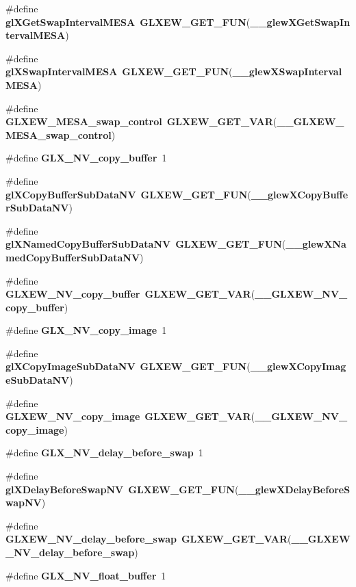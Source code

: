 \begin{DoxyCompactItemize}
\item 
\#define {\bf gl\+X\+Get\+Swap\+Interval\+M\+E\+SA}~{\bf G\+L\+X\+E\+W\+\_\+\+G\+E\+T\+\_\+\+F\+UN}({\bf \+\_\+\+\_\+glew\+X\+Get\+Swap\+Interval\+M\+E\+SA})
\item 
\#define {\bf gl\+X\+Swap\+Interval\+M\+E\+SA}~{\bf G\+L\+X\+E\+W\+\_\+\+G\+E\+T\+\_\+\+F\+UN}({\bf \+\_\+\+\_\+glew\+X\+Swap\+Interval\+M\+E\+SA})
\item 
\#define {\bf G\+L\+X\+E\+W\+\_\+\+M\+E\+S\+A\+\_\+swap\+\_\+control}~{\bf G\+L\+X\+E\+W\+\_\+\+G\+E\+T\+\_\+\+V\+AR}({\bf \+\_\+\+\_\+\+G\+L\+X\+E\+W\+\_\+\+M\+E\+S\+A\+\_\+swap\+\_\+control})
\item 
\#define {\bf G\+L\+X\+\_\+\+N\+V\+\_\+copy\+\_\+buffer}~1
\item 
\#define {\bf gl\+X\+Copy\+Buffer\+Sub\+Data\+NV}~{\bf G\+L\+X\+E\+W\+\_\+\+G\+E\+T\+\_\+\+F\+UN}({\bf \+\_\+\+\_\+glew\+X\+Copy\+Buffer\+Sub\+Data\+NV})
\item 
\#define {\bf gl\+X\+Named\+Copy\+Buffer\+Sub\+Data\+NV}~{\bf G\+L\+X\+E\+W\+\_\+\+G\+E\+T\+\_\+\+F\+UN}({\bf \+\_\+\+\_\+glew\+X\+Named\+Copy\+Buffer\+Sub\+Data\+NV})
\item 
\#define {\bf G\+L\+X\+E\+W\+\_\+\+N\+V\+\_\+copy\+\_\+buffer}~{\bf G\+L\+X\+E\+W\+\_\+\+G\+E\+T\+\_\+\+V\+AR}({\bf \+\_\+\+\_\+\+G\+L\+X\+E\+W\+\_\+\+N\+V\+\_\+copy\+\_\+buffer})
\item 
\#define {\bf G\+L\+X\+\_\+\+N\+V\+\_\+copy\+\_\+image}~1
\item 
\#define {\bf gl\+X\+Copy\+Image\+Sub\+Data\+NV}~{\bf G\+L\+X\+E\+W\+\_\+\+G\+E\+T\+\_\+\+F\+UN}({\bf \+\_\+\+\_\+glew\+X\+Copy\+Image\+Sub\+Data\+NV})
\item 
\#define {\bf G\+L\+X\+E\+W\+\_\+\+N\+V\+\_\+copy\+\_\+image}~{\bf G\+L\+X\+E\+W\+\_\+\+G\+E\+T\+\_\+\+V\+AR}({\bf \+\_\+\+\_\+\+G\+L\+X\+E\+W\+\_\+\+N\+V\+\_\+copy\+\_\+image})
\item 
\#define {\bf G\+L\+X\+\_\+\+N\+V\+\_\+delay\+\_\+before\+\_\+swap}~1
\item 
\#define {\bf gl\+X\+Delay\+Before\+Swap\+NV}~{\bf G\+L\+X\+E\+W\+\_\+\+G\+E\+T\+\_\+\+F\+UN}({\bf \+\_\+\+\_\+glew\+X\+Delay\+Before\+Swap\+NV})
\item 
\#define {\bf G\+L\+X\+E\+W\+\_\+\+N\+V\+\_\+delay\+\_\+before\+\_\+swap}~{\bf G\+L\+X\+E\+W\+\_\+\+G\+E\+T\+\_\+\+V\+AR}({\bf \+\_\+\+\_\+\+G\+L\+X\+E\+W\+\_\+\+N\+V\+\_\+delay\+\_\+before\+\_\+swap})
\item 
\#define {\bf G\+L\+X\+\_\+\+N\+V\+\_\+float\+\_\+buffer}~1
\item 

\end{DoxyCompactItemize}
